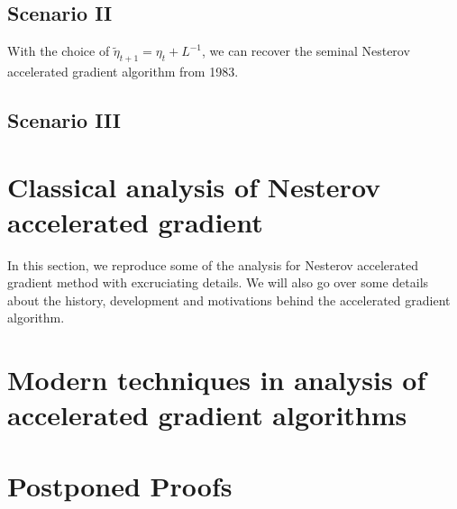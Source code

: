 \documentclass[12pt]{article}
\begin{document}
    \subsection{Scenario II}
        With the choice of $\tilde \eta_{t + 1} = \eta_t + L^{-1}$, we can recover the seminal Nesterov accelerated gradient algorithm from 1983. 

    \subsection{Scenario III}
    


\section{Classical analysis of Nesterov accelerated gradient}
    In this section, we reproduce some of the analysis for Nesterov accelerated gradient method with excruciating details. 
    We will also go over some details about the history, development and motivations behind the accelerated gradient algorithm. 

\section{Modern techniques in analysis of accelerated gradient algorithms}
    

\printbibliography

\appendix
\section*{Postponed Proofs}
\end{document}
